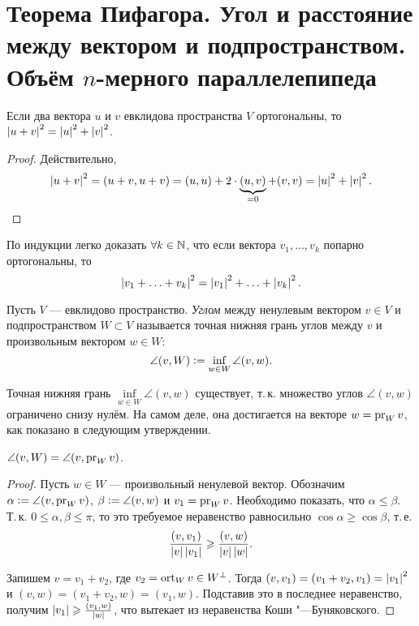 \section{Теорема Пифагора. Угол и расстояние между вектором и подпространством. Объём $n$-мерного параллелепипеда}

\begin{theorem}[Пифагор]
    Если два вектора $u$ и $v$ евклидова пространства $V$ ортогональны, то $\left\lvert u + v\right\rvert^2 = \left\lvert u\right\rvert^2 + \left\lvert v\right\rvert^2$.
\end{theorem}

\begin{proof}
    Действительно,
    \[
        \left\lvert u + v\right\rvert^2 = (u + v, u + v) = (u, u) + 2 \cdot \underbrace{(u, v)}_{{} = 0} + (v, v) = \left\lvert u\right\rvert^2 + \left\lvert v\right\rvert^2.
    \]
\end{proof}

\begin{remark}
    По индукции легко доказать $\forall k \in \mathbb{N}$, что если вектора $v_1, \ldots, v_k$ попарно ортогональны, то
    \[
        \left\lvert v_1 + \ldots + v_k\right\rvert^2 = \left\lvert v_1\right\rvert^2 + \ldots + \left\lvert v_k\right\rvert^2.
    \]
\end{remark}

\begin{definition}
    Пусть $V$ --- евклидово пространство. \textit{Углом} между ненулевым вектором $v \in V$ и подпространством $W \subset V$ называется точная нижняя грань углов между $v$ и произвольным вектором $w \in W$:
    \[
        \angle(v, W) \vcentcolon = \inf\limits_{w \in W}\angle(v, w).
    \]
\end{definition}

Точная нижняя грань $\inf\limits_{w \in W}\angle(v, w)$ существует, т.\,к. множество углов $\angle(v, w)$ ограничено снизу нулём. На самом деле, она достигается на векторе $w = \operatorname{pr}_Wv$, как показано в следующим утверждении.

\begin{proposal}
    $\angle(v, W) = \angle(v, \operatorname{pr}_Wv)$.
\end{proposal}

\begin{proof}
    Пусть $w \in W$ --- произвольный ненулевой вектор. Обозначим $\alpha \vcentcolon = \angle(v, \operatorname{pr}_Wv)$, $\beta \vcentcolon = \angle(v, w)$ и $v_1 = \operatorname{pr}_Wv$. Необходимо показать, что $\alpha \leqslant \beta$. Т.\,к. $0 \leqslant \alpha, \beta \leqslant \pi$, то это требуемое неравенство равносильно $\cos\alpha \geqslant \cos\beta$, т.\,е.
    \[
        \frac{(v, v_1)}{\left\lvert v\right\rvert\left\lvert v_1\right\rvert} \geqslant \frac{(v, w)}{\left\lvert v\right\rvert\left\lvert w\right\rvert}.
    \]

    Запишем $v = v_1 + v_2$, где $v_2 = \operatorname{ort}_Wv \in W^\perp$. Тогда $(v, v_1) = (v_1 + v_2, v_1) = \left\lvert v_1\right\rvert^2$ и $(v, w) = (v_1 + v_2, w) = (v_1, w)$. Подставив это в последнее неравенство, получим $\left\lvert v_1\right\rvert \geqslant \frac{(v_1, w)}{\left\lvert w\right\rvert}$, что вытекает из неравенства Коши "---Буняковского.
\end{proof}

